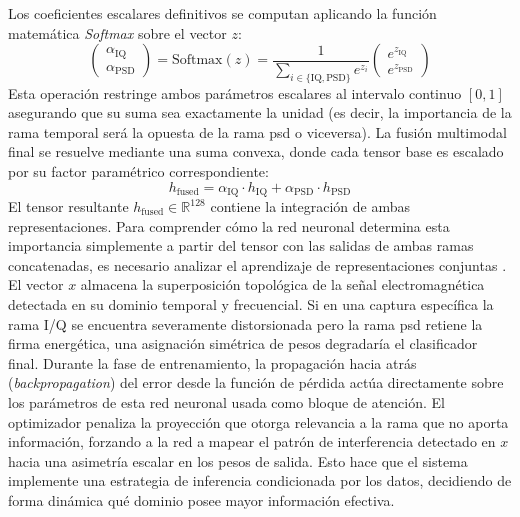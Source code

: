 Los coeficientes escalares definitivos se computan aplicando la función matemática \textit{Softmax} sobre el vector $z$:
\begin{equation}
    \begin{pmatrix} \alpha_{\text{IQ}} \\ \alpha_{\text{PSD}} \end{pmatrix} = \text{Softmax}(z) = \frac{1}{\sum_{i \in \{\text{IQ}, \text{PSD}\}} e^{z_i}} \begin{pmatrix} e^{z_{\text{IQ}}} \\ e^{z_{\text{PSD}}} \end{pmatrix}
\end{equation}
Esta operación restringe ambos parámetros escalares al intervalo continuo $[0, 1]$ asegurando que su suma sea exactamente la unidad (es decir, la importancia de la rama temporal será la opuesta de la rama \gls{psd} o viceversa). La fusión multimodal final se resuelve mediante una suma convexa, donde cada tensor base es escalado por su factor paramétrico correspondiente:
\begin{equation}
    h_{\text{fused}} = \alpha_{\text{IQ}} \cdot h_{\text{IQ}} + \alpha_{\text{PSD}} \cdot h_{\text{PSD}}
\end{equation}
El tensor resultante $h_{\text{fused}} \in \mathbb{R}^{128}$ contiene la integración de ambas representaciones. Para comprender cómo la red neuronal determina esta importancia simplemente a partir del tensor con las salidas de ambas ramas concatenadas, es necesario analizar el aprendizaje de representaciones conjuntas \cite{baltrusaitis_multimodal_2018, woo_cbam_2018}. El vector $x$ almacena la superposición topológica de la señal electromagnética detectada en su dominio temporal y frecuencial. Si en una captura específica la rama I/Q se encuentra severamente distorsionada pero la rama \gls{psd} retiene la firma energética, una asignación simétrica de pesos degradaría el clasificador final. Durante la fase de entrenamiento, la propagación hacia atrás (\textit{backpropagation}) del error desde la función de pérdida actúa directamente sobre los parámetros de esta red neuronal usada como bloque de atención. El optimizador penaliza la proyección que otorga relevancia a la rama que no aporta información, forzando a la red a mapear el patrón de interferencia detectado en $x$ hacia una asimetría escalar en los pesos de salida. Esto hace que el sistema implemente una estrategia de inferencia condicionada por los datos, decidiendo de forma dinámica qué dominio posee mayor información efectiva.

